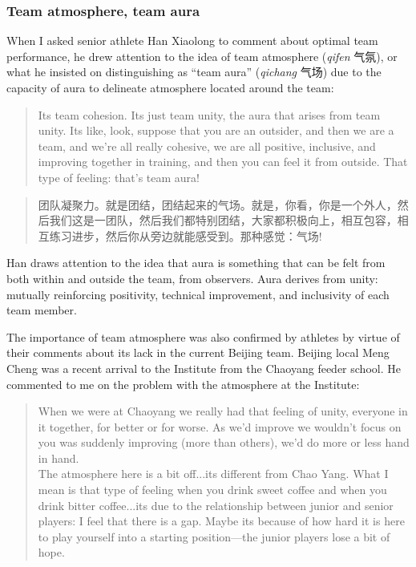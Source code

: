 \begin{CJK}{UTF8}{gbsn}
\subsubsection{Team atmosphere, team aura}

When I asked senior athlete Han Xiaolong to comment about optimal team performance, he drew attention to the idea of team atmosphere (\textit{qifen} 气氛), or what he insisted on distinguishing as ``team aura'' (\textit{qichang} 气场) due to the capacity of aura to delineate atmosphere located around the team:

    \begin{quote}
      Its team cohesion.  Its just team unity, the aura that arises from team unity.  Its like, look, suppose that you are an outsider, and then we are a team, and we’re all really cohesive, we are all positive, inclusive, and improving together in training, and then you can feel it from outside.  That type of feeling: that's team aura!
    \end{quote}

    \begin{quote}
      团队凝聚力。就是团结，团结起来的气场。就是，你看，你是一个外人，然后我们这是一团队，然后我们都特别团结，大家都积极向上，相互包容，相互练习进步，然后你从旁边就能感受到。那种感觉：气场! 
    \end{quote}

Han draws attention to the idea that aura is something that can be felt from both within and outside the team, from observers. Aura derives from unity: mutually reinforcing positivity, technical improvement, and inclusivity of each team member.

The importance of team atmosphere was also confirmed by athletes by virtue of their comments about its lack in the current Beijing team. Beijing local  Meng Cheng was a recent arrival to the Institute from the Chaoyang feeder school.  He commented to me on the problem with the atmosphere at the Institute:

    \begin{quote}
      When we were at Chaoyang we really had that feeling of unity, everyone in it together, for better or for worse.  As we'd improve we wouldn't focus on you was suddenly improving (more than others), we'd do more or less hand in hand.
    \\
      The atmosphere here is a bit off...its different from Chao Yang.  What I mean is that type of feeling when you drink sweet coffee and when you drink bitter coffee...its due to the relationship between junior and senior players: I feel that there is a gap.  Maybe its because of how hard it is here to play yourself into a starting position---the junior players lose a bit of hope.
    \end{quote}


\end{CJK}
